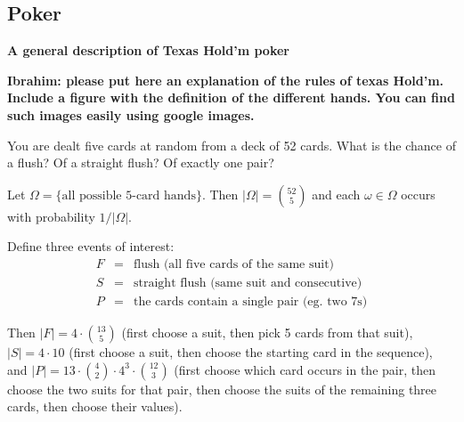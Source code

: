 \begin{enumerate}
\section{Poker}

{\bf A general description of Texas Hold'm poker}

{\bf Ibrahim: please put here an explanation of the rules of texas
  Hold'm. Include a figure with the definition of the different
  hands. You can find such images easily using google images.}

You are dealt five cards at random from a deck of 52 cards. What is the chance of a flush? Of a straight flush? Of exactly one pair?

Let $\Omega = \{\mbox{all possible 5-card hands}\}$. Then $|\Omega| = {52 \choose 5}$ and each $\omega \in \Omega$ occurs with probability $1/|\Omega|$. 

Define three events of interest: 
\begin{eqnarray*}
F & = & \mbox{flush (all five cards of the same suit)} \\
S & = & \mbox{straight flush (same suit and consecutive)} \\
P & = & \mbox{the cards contain a single pair (eg. two 7s)}
\end{eqnarray*}

Then $|F| = 4 \cdot {13 \choose 5}$ (first choose a suit, then pick 5 cards from that suit), $|S| = 4 \cdot 10$ (first choose a suit, then choose the starting card in the sequence), and $|P| = 13 \cdot {4 \choose 2} \cdot 4^3 \cdot {12 \choose 3}$ (first choose which card occurs in the pair, then choose the two suits for that pair, then choose the suits of the remaining three cards, then choose their values).
 
\end{enumerate}

